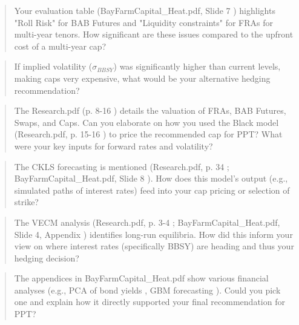\documentclass[11pt, a4paper, british]{article}
\begin{document}
\newpage

\begin{quote}
    Your evaluation table (BayFarmCapital_Heat.pdf, Slide 7 ) highlights "Roll Risk" for BAB Futures and "Liquidity constraints" for FRAs for multi-year tenors. How significant are these issues compared to the upfront cost of a multi-year cap?
\end{quote}

\newpage

\begin{quote}
    If implied volatility ($\sigma_{BBSY}$) was significantly higher than current levels, making caps very expensive, what would be your alternative hedging recommendation?
\end{quote}

\newpage

\begin{quote}
    The Research.pdf (p. 8-16 ) details the valuation of FRAs, BAB Futures, Swaps, and Caps. Can you elaborate on how you used the Black model (Research.pdf, p. 15-16 ) to price the recommended cap for PPT? What were your key inputs for forward rates and volatility?
\end{quote}

\newpage

\begin{quote}
    The CKLS forecasting is mentioned (Research.pdf, p. 34 ; BayFarmCapital_Heat.pdf, Slide 8 ). How does this model's output (e.g., simulated paths of interest rates) feed into your cap pricing or selection of strike?
\end{quote}

\newpage

\begin{quote}
    The VECM analysis (Research.pdf, p. 3-4 ; BayFarmCapital_Heat.pdf, Slide 4, Appendix ) identifies long-run equilibria. How did this inform your view on where interest rates (specifically BBSY) are heading and thus your hedging decision?
\end{quote}

\newpage

\begin{quote}
    The appendices in BayFarmCapital_Heat.pdf show various financial analyses (e.g., PCA of bond yields , GBM forecasting ). Could you pick one and explain how it directly supported your final recommendation for PPT?
\end{quote}

\newpage
\end{document}
